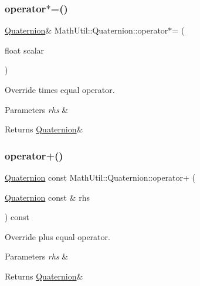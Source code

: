 \subsubsection{\texorpdfstring{operator$\ast$=()}{operator*=()}\hspace{0.1cm}{\footnotesize\ttfamily [2/2]}}
{\footnotesize\ttfamily \hyperlink{structMathUtil_1_1Quaternion}{Quaternion}\& Math\+Util\+::\+Quaternion\+::operator$\ast$= (\begin{DoxyParamCaption}\item[{float}]{scalar }\end{DoxyParamCaption})\hspace{0.3cm}{\ttfamily [inline]}}



Override times equal operator. 


\begin{DoxyParams}{Parameters}
{\em rhs} & \\
\hline
\end{DoxyParams}
\begin{DoxyReturn}{Returns}
\hyperlink{structMathUtil_1_1Quaternion}{Quaternion}\& 
\end{DoxyReturn}
\mbox{\label{structMathUtil_1_1Quaternion_a339741f5707630e1914494ceb389aeeb}} 
\subsubsection{\texorpdfstring{operator+()}{operator+()}}
{\footnotesize\ttfamily \hyperlink{structMathUtil_1_1Quaternion}{Quaternion} const Math\+Util\+::\+Quaternion\+::operator+ (\begin{DoxyParamCaption}\item[{\hyperlink{structMathUtil_1_1Quaternion}{Quaternion} const \&}]{rhs }\end{DoxyParamCaption}) const\hspace{0.3cm}{\ttfamily [inline]}}



Override plus equal operator. 


\begin{DoxyParams}{Parameters}
{\em rhs} & \\
\hline
\end{DoxyParams}
\begin{DoxyReturn}{Returns}
\hyperlink{structMathUtil_1_1Quaternion}{Quaternion}\& 
\end{DoxyReturn}
\mbox{\label{structMathUtil_1_1Quaternion_aae4976a202e56ca8602c64a5d97fafb8}} 
